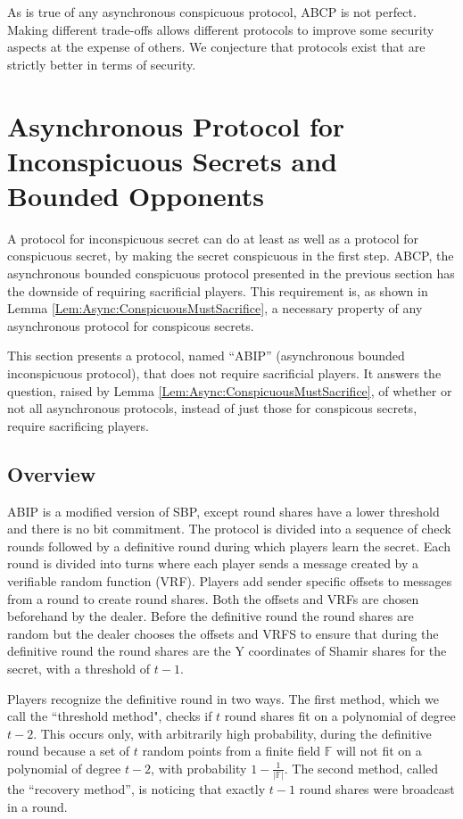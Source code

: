 \documentclass{dalcsthesis}
\begin{document}
As is true of any asynchronous conspicuous protocol, ABCP is not perfect. Making different trade-offs allows different protocols to improve some security aspects at the expense of others. We conjecture that protocols exist that are strictly better in terms of security.



\section{Asynchronous Protocol for Inconspicuous Secrets and Bounded Opponents}

A protocol for inconspicuous secret can do at least as well as a protocol for conspicuous secret, by making the secret conspicuous in the first step. ABCP, the asynchronous bounded conspicuous protocol presented in the previous section has the downside of requiring sacrificial players. This requirement is, as shown in Lemma \ref{Lem:Async:ConspicuousMustSacrifice}, a necessary property of any asynchronous protocol for conspicous secrets.

This section presents a protocol, named ``ABIP'' (asynchronous bounded inconspicuous protocol), that does not require sacrificial players. It answers the question, raised by Lemma \ref{Lem:Async:ConspicuousMustSacrifice}, of whether or not all asynchronous protocols, instead of just those for conspicous secrets, require sacrificing players.


\subsection{Overview}

ABIP is a modified version of SBP, except round shares have a lower threshold and there is no bit commitment. The protocol is divided into a sequence of check rounds followed by a definitive round during which players learn the secret. Each round is divided into turns where each player sends a message created by a verifiable random function (VRF). Players add sender specific offsets to messages from a round to create round shares. Both the offsets and VRFs are chosen beforehand by the dealer. Before the definitive round the round shares are random but the dealer chooses the offsets and VRFS to ensure that during the definitive round the round shares are the Y coordinates of Shamir shares for the secret, with a threshold of $t-1$.

Players recognize the definitive round in two ways. The first method, which we call the ``threshold method", checks if $t$ round shares fit on a polynomial of degree $t-2$. This occurs only, with arbitrarily high probability, during the definitive round because a set of $t$ random points from a finite field $\mathbb{F}$ will not fit on a polynomial of degree $t-2$, with probability $1 - \frac{1}{|\mathbb{F}|}$. The second method, called the ``recovery method'', is noticing that exactly $t-1$ round shares were broadcast in a round.
\end{document}
